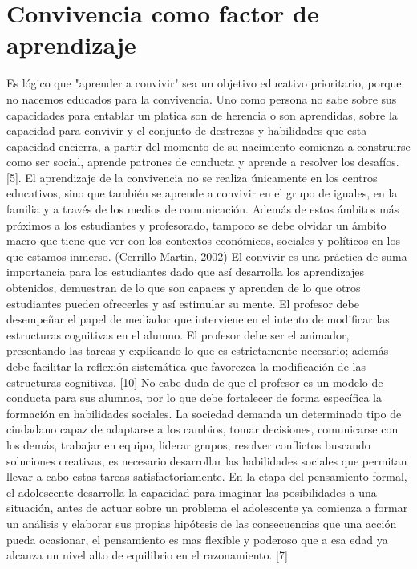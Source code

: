 \documentclass{bmcart}
\begin{document}
\section*{Convivencia como factor de aprendizaje}
Es lógico que "aprender a convivir" sea un objetivo educativo prioritario, porque no nacemos educados para la convivencia. Uno como persona no sabe sobre sus capacidades para entablar un platica son de herencia o son aprendidas, sobre la capacidad para convivir y el conjunto de destrezas y habilidades que esta capacidad encierra, a partir del momento de su nacimiento comienza a construirse como ser social, aprende patrones de conducta y aprende a resolver los desafíos. [5].
\newline
\newline
El aprendizaje de la convivencia no se realiza únicamente en los centros educativos, sino que también se aprende a convivir en el grupo de iguales, en la familia y a través de los medios de comunicación. Además de estos ámbitos más próximos a los estudiantes y profesorado, tampoco se debe olvidar un ámbito macro que tiene que ver con los contextos económicos, sociales y políticos en los que estamos inmerso. (Cerrillo Martin, 2002)
\newline
\newline
El convivir es una práctica de suma importancia para los estudiantes dado que así desarrolla los aprendizajes obtenidos, demuestran de lo que son capaces y aprenden de lo que otros estudiantes pueden ofrecerles y así estimular su mente.
\newline
\newline
El profesor debe desempeñar el papel de mediador que interviene en el intento de modificar las estructuras cognitivas en el alumno. El profesor debe ser el animador, presentando las tareas y explicando lo que es estrictamente necesario; además debe facilitar la reflexión sistemática que favorezca la modificación de las estructuras cognitivas. [10]
\newline
\newline
No cabe duda de que el profesor es un modelo de conducta para sus alumnos, por lo que debe fortalecer de forma específica la  formación en habilidades   sociales. La sociedad demanda un determinado tipo de ciudadano capaz de adaptarse a los cambios, tomar decisiones, comunicarse con los demás, trabajar en equipo, liderar grupos, resolver conflictos buscando soluciones creativas, es necesario desarrollar las habilidades sociales que permitan llevar a cabo estas tareas  satisfactoriamente.
\newline
\newline
En la etapa del pensamiento formal, el adolescente desarrolla la capacidad para imaginar las posibilidades a una situación, antes de actuar sobre un problema el adolescente ya comienza a formar un análisis y elaborar sus propias hipótesis de las consecuencias que una acción pueda ocasionar, el pensamiento es mas flexible y poderoso que a esa edad ya alcanza un nivel alto de equilibrio en el razonamiento. [7]
\end{document}
